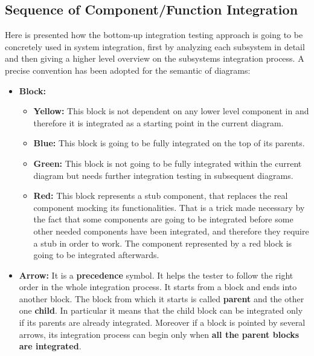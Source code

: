 \subsection{Sequence of Component/Function Integration}
\label{sec:section_2.4}
Here is presented how the bottom-up integration testing approach is going to be concretely used in \myTaxiService{} system integration, first by analyzing each subsystem in detail and then giving a higher level overview on the subsystems integration process.
A precise convention has been adopted for the semantic of diagrams:
\begin{itemize}
	\item
		\textbf{Block:}
		\begin{itemize}
			\item \textbf{Yellow:} This block is not dependent on any lower level component in \myTaxiService{} and therefore it is integrated as a starting point in the current diagram.
			\item \textbf{Blue:} This block is going to be fully integrated on the top of its parents.
			\item \textbf{Green:} This block is not going to be fully integrated within the current diagram but needs further integration testing in subsequent diagrams.
			\item \textbf{Red:} This block represents a stub component, that replaces the real component mocking its functionalities.
			That is a trick made necessary by the fact that some components are going to be integrated before some other needed components have been integrated, and therefore they require a stub in order to work.
			The component represented by a red block is going to be integrated afterwards.
		\end{itemize}
	\item
		\textbf{Arrow:} It is a \textbf{precedence} symbol. It helps the tester to follow the right order in the whole integration process. It starts from a block and ends into another block. The block from which it starts is called \textbf{parent} and the other one \textbf{child}. In particular it means that the child block can be integrated only if its parents are already integrated. Moreover if a block is pointed by several arrows, its integration process can begin only when \textbf{all the parent blocks are integrated}.
\end{itemize}
%
\newpage
